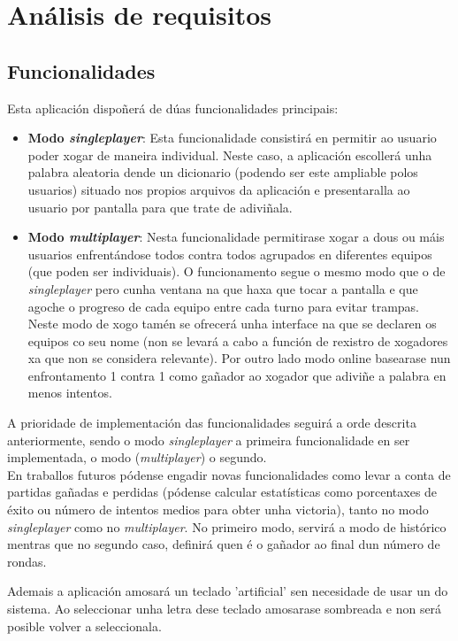 \chapter{Análisis de requisitos}
\label{chap:requisitos}
\section{Funcionalidades}
Esta aplicación dispoñerá de dúas funcionalidades principais:
\begin{itemize}
    \item \textbf{Modo \textit{singleplayer}}: Esta funcionalidade consistirá en permitir ao usuario poder xogar de maneira individual. Neste caso, a aplicación escollerá unha palabra aleatoria dende un dicionario (podendo ser este ampliable polos usuarios) situado nos propios arquivos da aplicación e presentaralla ao usuario por pantalla para que trate de adiviñala.
    \item \textbf{Modo \textit{multiplayer}}: Nesta funcionalidade permitirase xogar a dous ou máis usuarios enfrentándose todos contra todos agrupados en diferentes equipos (que poden ser individuais). O funcionamento segue o mesmo modo que o de \textit{singleplayer} pero cunha ventana na que haxa que tocar a pantalla e que agoche o progreso de cada equipo entre cada turno para evitar trampas. Neste modo de xogo tamén se ofrecerá unha interface na que se declaren os equipos co seu nome (non se levará a cabo a función de rexistro de xogadores xa que non se considera relevante). Por outro lado modo online basearase nun enfrontamento 1 contra 1 como gañador ao xogador que adiviñe a palabra en menos intentos.
\end{itemize}

A prioridade de implementación das funcionalidades seguirá a orde descrita anteriormente, sendo o modo \textit{singleplayer} a primeira funcionalidade en ser implementada, o modo (\textit{multiplayer}) o segundo. \\
En traballos futuros pódense engadir novas funcionalidades como levar a conta de partidas gañadas e perdidas (pódense calcular estatísticas como porcentaxes de éxito ou número de intentos medios para obter unha victoria), tanto no modo \textit{singleplayer} como no \textit{multiplayer}. No primeiro modo, servirá a modo de histórico mentras que no segundo caso, definirá quen é o gañador ao final dun número de rondas.

Ademais a aplicación amosará un teclado 'artificial' sen necesidade de usar un do sistema. Ao seleccionar unha letra dese teclado amosarase sombreada e non será posible volver a seleccionala.
 \let\cleardoublepage=\clearpage 